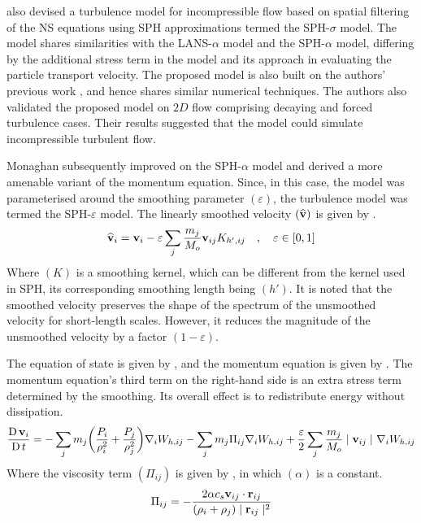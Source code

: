 \cite{Hu2015} also devised a turbulence model for incompressible flow based on spatial filtering of the NS equations using SPH approximations termed the SPH-$\sigma$ model. The model shares similarities with the LANS-$\alpha$ model and the SPH-$\alpha$ model, differing by the additional stress term in the model and its approach in evaluating the particle transport velocity. The proposed model is also built on the authors’ previous work \parencite{hu2007incompressible}, and hence shares similar numerical techniques. The authors also validated the proposed model on $2D$ flow comprising decaying and forced turbulence cases. Their results suggested that the model could simulate incompressible turbulent flow.

Monaghan \parencite{Monaghan2011, Monaghan2017} subsequently improved on the SPH-$\alpha$ model and derived a more amenable variant of the momentum equation. Since, in this case, the model was parameterised around the smoothing parameter $(\varepsilon)$, the turbulence model was termed the SPH-$\varepsilon$ model. The linearly smoothed velocity $(\widehat{\mathbf{v}})$ is given by .
\begin{equation}
    \widehat{\vect{v}}_i = \vect{v}_i - \varepsilon \sum_j \frac{m_j}{M_o} \VIJ K_{h', ij} \quad , \quad \varepsilon \in [0, 1]
    \label{eq:Monaghan2017-xsph-vel-smoothing}
\end{equation}
Where $(K)$ is a smoothing kernel, which can be different from the kernel used in SPH, its corresponding smoothing length being $(h')$. It is noted that the smoothed velocity preserves the shape of the spectrum of the unsmoothed velocity for short-length scales. However, it reduces the magnitude of the unsmoothed velocity by a factor $(1-\varepsilon)$. 

The equation of state is given by , and the momentum equation is given by . The momentum equation’s third term on the right-hand side is an extra stress term determined by the smoothing. Its overall effect is to redistribute energy without dissipation.
\begin{equation}
    \LagDerivative{\vect{v}_i} = - \sum_j m_j \bigg( \frac{P_i}{\rho_i^2} + \frac{P_j}{\rho_j^2} \bigg) \DWIJ - \sum_j m_j \Pi_{ij} \DWIJ + \frac{\varepsilon}{2} \sum_j \frac{m_j}{M_o} \VtwoIJ[] \DWIJ 
    \label{eq:Monaghan2017-mom-governing}
\end{equation}
Where the viscosity term $(\Pi_{ij})$ is given by , in which $(\alpha)$ is a constant.
\begin{equation}
    \Pi_{ij} = - \frac{2 \alpha c_s \VIJ \cdot \RIJ}{(\rho_i + \rho_j) \RtwoIJ}
    \label{eq:Monaghan2017-Pi-visc-term}
\end{equation}

